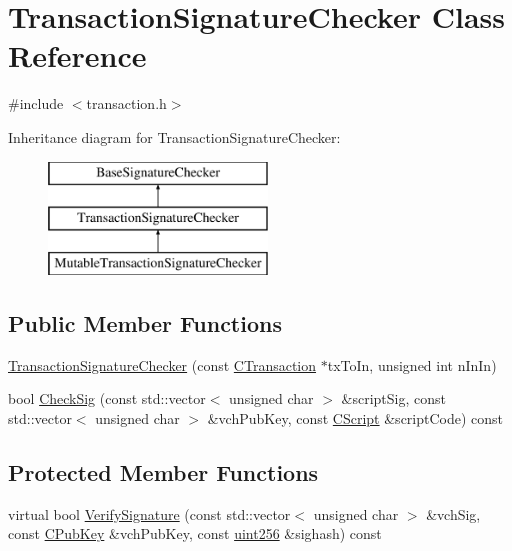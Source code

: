 \hypertarget{class_transaction_signature_checker}{}\section{Transaction\+Signature\+Checker Class Reference}
\label{class_transaction_signature_checker}


{\ttfamily \#include $<$transaction.\+h$>$}

Inheritance diagram for Transaction\+Signature\+Checker\+:\begin{figure}[H]
\begin{center}
\leavevmode
\includegraphics[height=3.000000cm]{class_transaction_signature_checker}
\end{center}
\end{figure}
\subsection*{Public Member Functions}
\begin{DoxyCompactItemize}
\item 
\hyperlink{class_transaction_signature_checker_ab1e6927dad48bb5ae8109acdb39eaf56}{Transaction\+Signature\+Checker} (const \hyperlink{class_c_transaction}{C\+Transaction} $\ast$tx\+To\+In, unsigned int n\+In\+In)
\item 
bool \hyperlink{class_transaction_signature_checker_a6d9044dff84be9a2c2233fdf1508f9ab}{Check\+Sig} (const std\+::vector$<$ unsigned char $>$ \&script\+Sig, const std\+::vector$<$ unsigned char $>$ \&vch\+Pub\+Key, const \hyperlink{class_c_script}{C\+Script} \&script\+Code) const 
\end{DoxyCompactItemize}
\subsection*{Protected Member Functions}
\begin{DoxyCompactItemize}
\item 
virtual bool \hyperlink{class_transaction_signature_checker_a59179724477a42488a70a2828f51093d}{Verify\+Signature} (const std\+::vector$<$ unsigned char $>$ \&vch\+Sig, const \hyperlink{class_c_pub_key}{C\+Pub\+Key} \&vch\+Pub\+Key, const \hyperlink{classuint256}{uint256} \&sighash) const 
\end{DoxyCompactItemize}


